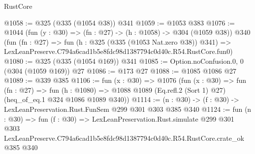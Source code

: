 \begin{lexlean}{RustCore}
\begin{coremodule}
@1058 := @325 (@335 (@1054 @38)) @341
@1059 := @1053 @383
@1076 := @1044
    (fun (y : @30) => (fn : @27) -> (h : @1058) -> @304 (@1059 @38))
    @340
    (fun (fn : @27) =>
    fun (h : @325 (@335 (@1053 Nat.zero @38)) @341) =>
    LexLeanPreserve.C794a6cad1b5e8fdc98d1387794c0d40c.R54.RustCore.fun0)
@1080 := @325 (@335 (@1054 @169)) @341
@1085 := Option.noConfusion.{0, 0} (@304 (@1059 @169)) @27
@1086 := @173 @27
@1088 := @1085 @1086 @27
@1089 := @339 @385
@1106 := fun (x : @30) =>
  @1076
    (fun (x : @30) =>
    fun (fn : @27) =>
    fun (h : @1080) => @1088 @1089 (Eq.refl.{2} (Sort 1) @27) (heq_of_eq.{1} @324 @1086 @1089 @340))
@1114 := (n : @30) -> (f : @30) -> LexLeanPreservation.Rust.FunSem @299 @301 @303 @385 @340
@1124 := fun (n : @30) =>
  fun (f : @30) =>
  LexLeanPreservation.Rust.simulate
    @299
    @301
    @303
    LexLeanPreserve.C794a6cad1b5e8fdc98d1387794c0d40c.R54.RustCore.crate_ok
    @385
    @340
\end{coremodule}
\end{lexlean}
